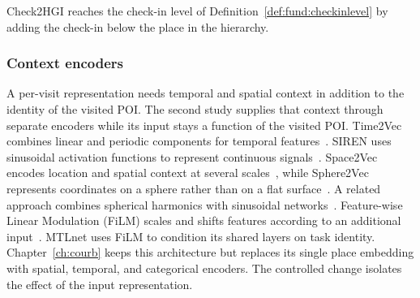 Check2HGI reaches the check-in level of Definition~\ref{def:fund:checkinlevel} by
adding the check-in below the place in the hierarchy.

\subsubsection{Context encoders}

A per-visit representation needs temporal and spatial context in addition to the
identity of the visited POI. The second study supplies that context through separate
encoders while its input stays a function of the visited POI.
Time2Vec combines linear and periodic components for temporal
features~\cite{kazemi2019time2vec}. SIREN uses sinusoidal activation functions to
represent continuous signals~\cite{sitzmann2020implicit}. Space2Vec encodes location
and spatial context at several scales~\cite{mai2020multiscalerepresentationlearningspatial},
while Sphere2Vec represents coordinates on a sphere rather than on a flat
surface~\cite{mai2023sphere2vecgeneralpurposelocationrepresentation}. A related
approach combines spherical harmonics with sinusoidal
networks~\cite{russwurm2024geographiclocationencodingspherical}. Feature-wise Linear
Modulation (FiLM) scales and shifts features according to an additional
input~\cite{perez2018film}. MTLnet uses FiLM to condition its shared layers on task
identity. Chapter~\ref{ch:courb} keeps this architecture but replaces its single
place embedding with spatial, temporal, and categorical encoders. The controlled
change isolates the effect of the input representation.

